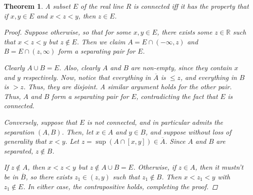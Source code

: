 \documentclass{scrbook}
\newcommand{\R}{\mathbb{R}}
\newtheorem{theorem}{Theorem}
\begin{document}
\begin{theorem}
A subset $E$ of the real line $R$ is connected iff it has the property that if $x, y \in E$ and $x < z < y$, then $z \in E$. 

\begin{proof}
Suppose otherwise, so that for some $x, y \in E$, there exists some $z \in \R$ such that $x < z < y$ but $z \not\in E$. Then we claim $A = E \cap (-\infty, z)$ and $B = E \cap (z, \infty)$ form a separating pair for $E$. 

Clearly $A \cup B = E$. Also, clearly $A$ and $B$ are non-empty, since they contain $x$ and $y$ respectively. Now, notice that everything in $\overline{A}$ is $\le z$, and everything in $B$ is $> z$. Thus, they are disjoint. A similar argument holds for the other pair. Thus, $A$ and $B$ form a separating pair for $E$, contradicting the fact that $E$ is connected.

Conversely, suppose that $E$ is not connected, and in particular admits the separation $(A, B)$.  Then, let $x \in A$ and $y \in B$, and suppose without loss of generality that $x < y$. Let $z = \sup(A \cap [x, y]) \in \overline{A}$. Since $A$ and $B$ are separated, $z \not\in B$. 

If $z \not\in A$, then $x < z < y$ but $z \not\in A \cup B = E$. Otherwise, if $z \in A$, then it mustn't be in $\overline{B}$, so there exists $z_1 \in (z, y)$ such that $z_1 \not\in B$. Then $x < z_1 < y$ with $z_1 \not\in E$. In either case, the contrapositive holds, completing the proof.
\end{proof}
\end{theorem}
\end{document}
